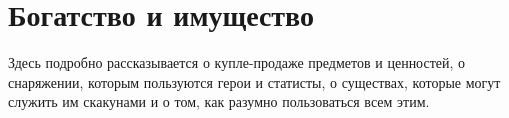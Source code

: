 \chapter{Богатство и имущество}
Здесь подробно рассказывается о купле-продаже предметов и ценностей, о снаряжении, которым пользуются герои и статисты, о существах, которые могут служить им скакунами и о том, как разумно пользоваться всем этим.










